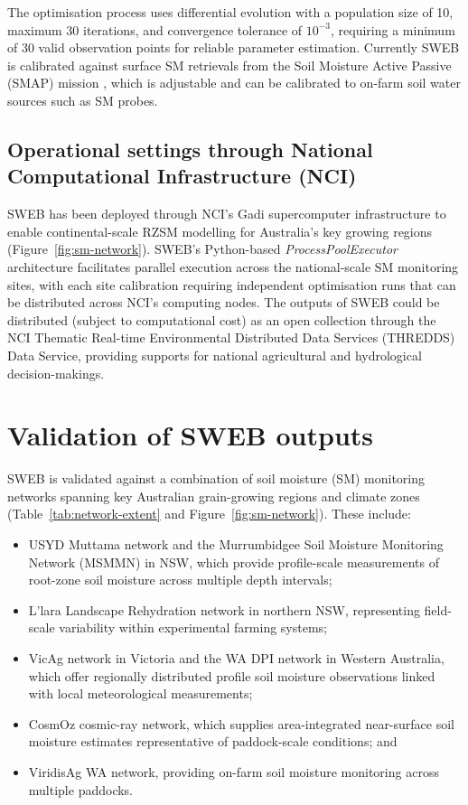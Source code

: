 \documentclass[11pt,a4paper]{article}
\begin{document}
The optimisation process uses differential evolution with a population size of 10, maximum 30 iterations, and convergence tolerance of $10^{-3}$, requiring a minimum of 30 valid observation points for reliable parameter estimation. Currently SWEB is calibrated against surface SM retrievals from the Soil Moisture Active Passive (SMAP) mission \citep{entekhabi_soil_2010}, which is adjustable and can be calibrated to on-farm soil water sources such as SM probes.

\subsection{Operational settings through National Computational Infrastructure (NCI)}

SWEB has been deployed through NCI's Gadi supercomputer infrastructure to enable continental-scale RZSM modelling for Australia's key growing regions (Figure~\ref{fig:sm-network}). SWEB's Python-based \emph{ProcessPoolExecutor} architecture facilitates parallel execution across the national-scale SM monitoring sites, with each site calibration requiring independent optimisation runs that can be distributed across NCI's computing nodes. The outputs of SWEB could be distributed (subject to computational cost) as an open collection through the NCI Thematic Real-time Environmental Distributed Data Services (THREDDS) Data Service, providing supports for national agricultural and hydrological decision-makings.

\section{Validation of SWEB outputs}

SWEB is validated against a combination of soil moisture (SM) monitoring networks spanning key Australian grain-growing regions and climate zones (Table~\ref{tab:network-extent} and Figure~\ref{fig:sm-network}). These include:

\begin{itemize}
\item USYD Muttama network and the Murrumbidgee Soil Moisture Monitoring Network (MSMMN) in NSW, which provide profile-scale measurements of root-zone soil moisture across multiple depth intervals;
\item L'lara Landscape Rehydration network in northern NSW, representing field-scale variability within experimental farming systems;
\item VicAg network in Victoria and the WA DPI network in Western Australia, which offer regionally distributed profile soil moisture observations linked with local meteorological measurements;
\item CosmOz cosmic-ray network, which supplies area-integrated near-surface soil moisture estimates representative of paddock-scale conditions; and
\item ViridisAg WA network, providing on-farm soil moisture monitoring across multiple paddocks.
\end{itemize}
\end{document}
